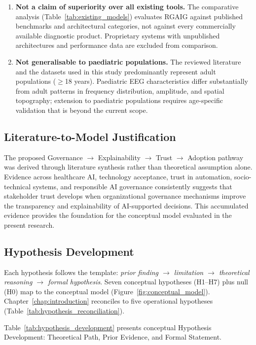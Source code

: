 \begin{enumerate}
    \item \textbf{Not a claim of superiority over all existing tools.} The comparative analysis (Table~\ref{tab:existing_models}) evaluates RGAIG against published benchmarks and architectural categories, not against every commercially available diagnostic product. Proprietary systems with unpublished architectures and performance data are excluded from comparison.
    \item \textbf{Not generalisable to paediatric populations.} The reviewed literature and the datasets used in this study predominantly represent adult populations ($\geq$18 years). Paediatric EEG characteristics differ substantially from adult patterns in frequency distribution, amplitude, and spatial topography; extension to paediatric populations requires age-specific validation that is beyond the current scope.
\end{enumerate}
\fi %


\subsection{Literature-to-Model Justification}
\label{sec:literature_to_model_justification}

\noindent The proposed Governance $\rightarrow$ Explainability $\rightarrow$ Trust $\rightarrow$ Adoption pathway was derived through literature synthesis rather than theoretical assumption alone. Evidence across healthcare AI, technology acceptance, trust in automation, socio-technical systems, and responsible AI governance consistently suggests that stakeholder trust develops when organizational governance mechanisms improve the transparency and explainability of AI-supported decisions. This accumulated evidence provides the foundation for the conceptual model evaluated in the present research.

\subsection{Hypothesis Development}

Each hypothesis follows the template: \emph{prior finding $\to$ limitation $\to$ theoretical reasoning $\to$ formal hypothesis}. Seven conceptual hypotheses (H1--H7) plus null (H0) map to the conceptual model (Figure~\ref{fig:conceptual_model}). Chapter~\ref{chap:introduction} reconciles to five operational hypotheses (Table~\ref{tab:hypothesis_reconciliation}).

\noindent Table~\ref{tab:hypothesis_development} presents conceptual Hypothesis Development: Theoretical Path, Prior Evidence, and Formal Statement.

